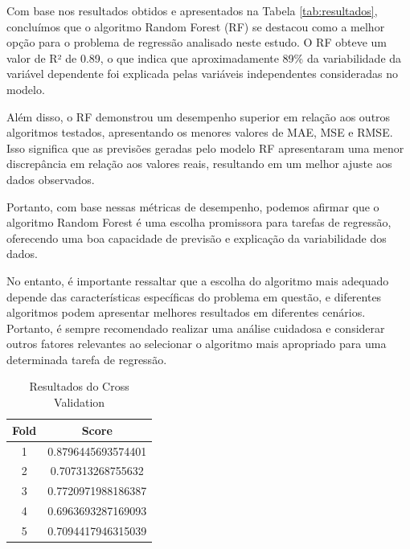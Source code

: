 \documentclass[conference]{IEEEtran}
\begin{document}
Com base nos resultados obtidos e apresentados na Tabela \ref{tab:resultados}, concluímos que o algoritmo Random Forest (RF) se destacou como a melhor opção para o problema de regressão analisado neste estudo. O RF obteve um valor de R² de 0.89, o que indica que aproximadamente 89\% da variabilidade da variável dependente foi explicada pelas variáveis independentes consideradas no modelo.

Além disso, o RF demonstrou um desempenho superior em relação aos outros algoritmos testados, apresentando os menores valores de MAE, MSE e RMSE. Isso significa que as previsões geradas pelo modelo RF apresentaram uma menor discrepância em relação aos valores reais, resultando em um melhor ajuste aos dados observados.

Portanto, com base nessas métricas de desempenho, podemos afirmar que o algoritmo Random Forest é uma escolha promissora para tarefas de regressão, oferecendo uma boa capacidade de previsão e explicação da variabilidade dos dados.

No entanto, é importante ressaltar que a escolha do algoritmo mais adequado depende das características específicas do problema em questão, e diferentes algoritmos podem apresentar melhores resultados em diferentes cenários. Portanto, é sempre recomendado realizar uma análise cuidadosa e considerar outros fatores relevantes ao selecionar o algoritmo mais apropriado para uma determinada tarefa de regressão.

\begin{table}[h]
\centering
\caption{Resultados do Cross Validation}
\begin{tabular}{|c|c|}
\hline
Fold & Score \\
\hline
1 & 0.8796445693574401 \\
2 & 0.707313268755632 \\
3 & 0.7720971988186387 \\
4 & 0.6963693287169093 \\
5 & 0.7094417946315039 \\
\hline
\end{tabular}
\end{table}
\end{document}
